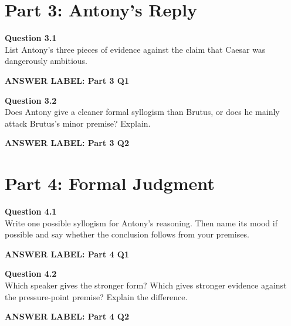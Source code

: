 \documentclass[12pt]{article}
\newcommand{\answerbox}[2]{%
\vspace{0.12em}
\noindent\textbf{#1}\par
\vspace{0.04em}
\noindent\fbox{%
\begin{minipage}[t][#2]{\dimexpr\textwidth-2\fboxsep-2\fboxrule}
\rule{\textwidth}{0pt}
\vspace{#2}
\end{minipage}}
\par\vspace{0.22em}}
\begin{document}
\newpage

\section*{Part 3: Antony's Reply}

\textbf{Question 3.1}\\[-0.15em]
List Antony's three pieces of evidence against the claim that Caesar was dangerously ambitious.

\answerbox{ANSWER LABEL: Part 3 Q1}{2.25in}

\textbf{Question 3.2}\\[-0.15em]
Does Antony give a cleaner formal syllogism than Brutus, or does he mainly attack Brutus's minor premise? Explain.

\answerbox{ANSWER LABEL: Part 3 Q2}{2.45in}

\newpage

\section*{Part 4: Formal Judgment}

\textbf{Question 4.1}\\[-0.15em]
Write one possible syllogism for Antony's reasoning. Then name its mood if possible and say whether the conclusion follows from your premises.

\answerbox{ANSWER LABEL: Part 4 Q1}{2.75in}

\textbf{Question 4.2}\\[-0.15em]
Which speaker gives the stronger form? Which gives stronger evidence against the pressure-point premise? Explain the difference.

\answerbox{ANSWER LABEL: Part 4 Q2}{2.25in}
\end{document}
